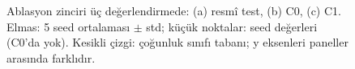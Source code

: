 \begin{figure}[!htbp]
\caption{Ablasyon zinciri üç değerlendirmede: (a) resmî test, (b) C0, (c) C1. Elmas: 5 seed ortalaması $\pm$ std; küçük noktalar: seed değerleri (C0'da yok). Kesikli çizgi: çoğunluk sınıfı tabanı; y eksenleri paneller arasında farklıdır.}
\label{fig:ablasyon}
\end{figure}
